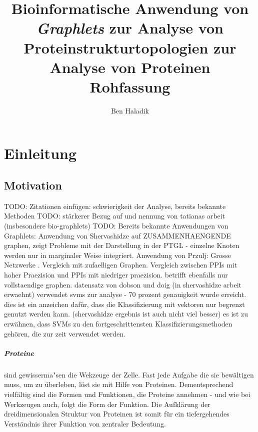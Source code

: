\documentclass{report}
\author{Ben Haladik}
\title{Bioinformatische Anwendung von \textit{Graphlets} zur Analyse von Proteinstrukturtopologien zur Analyse von Proteinen \\ Rohfassung}
\begin{document}


\maketitle

\newpage

\tableofcontents

\newpage

\chapter{Einleitung}

\section{Motivation}

TODO: Zitationen einf\"ugen: schwierigkeit der Analyse, bereits bekannte Methoden
TODO: stärkerer Bezug auf und nennung von tatianas arbeit (insbesondere bio-graphlets)
TODO: Bereits bekannte Anwendungen von Graphlets: Anwendung von Shervashidze auf ZUSAMMENHAENGENDE graphen, zeigt Probleme mit der Darstellung in der PTGL - einzelne Knoten werden nur in marginaler Weise integriert.
Anwendung von Przulj: Grosse Netzwerke . Vergleich mit zufaelligen Graphen. Vergleich zwischen PPIs mit hoher Praezision und PPIs mit niedriger praezision. betrifft ebenfalls nur vollstaendige graphen.
datensatz von dobson und doig (in shervashidze arbeit erwaehnt) verwendet svms zur analyse - 70 prozent genauigkeit wurde erreicht. dies ist ein anzeichen daf\"ur, dass die Klassifizierung mit vektoren nur begrenzt genutzt werden kann. (shervashidze ergebnis ist auch nicht viel besser)
es ist zu erw\"ahnen, dass SVMs zu den fortgeschrittensten Klassifizierungsmethoden geh\"oren, die zur zeit verwendet werden.


\paragraph{Proteine} sind gewisserma"sen die Wekzeuge der Zelle. Fast jede Aufgabe die sie bew\"altigen muss, um zu \"uberleben, l\"ost sie mit Hilfe von Proteinen. Dementsprechend vielf\"altig sind die Formen und Funktionen, die Proteine annehmen - und wie bei Werkzeugen auch, folgt die Form der Funktion. Die Aufkl\"arung der dreidimensionalen Struktur von Proteinen ist somit f\"ur ein tiefergehendes Verst\"andnis ihrer Funktion von zentraler Bedeutung.
\end{document}

